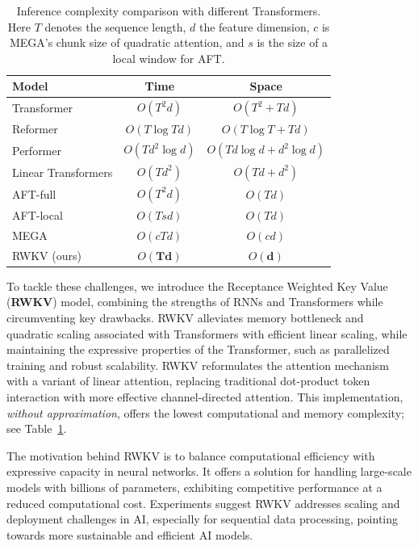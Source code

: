 \documentclass[11pt]{article}
\begin{document}
\begin{table}
\centering
\setlength{\tabcolsep}{2pt}
\small
\begin{tabular}{lcc}
\toprule
\textbf{Model} & \textbf{Time} & \textbf{Space}\\
\midrule
Transformer & $O(T^2d)$ & $O(T^2 + Td)$ \\
Reformer & $O(T\log{T}  d)$ & $O(T\log{T} + Td)$ \\
Performer & $O(T d^2\log{d})$ & $O(Td\log{d} + d^2\log{d})$ \\
Linear Transformers & $O(T d^2)$ & $O(Td + d^2)$ \\
AFT-full & $O(T^2d)$ & $O(Td)$ \\
AFT-local & $O(T sd)$ & $O(Td)$ \\
MEGA & $O(cTd)$ & $O(cd)$\\\midrule
RWKV (ours) & $O(\mathbf{Td})$ & $O(\mathbf{d})$ \\
\bottomrule
\end{tabular}
\caption{Inference complexity comparison with different Transformers. Here $T$ denotes the sequence length, $d$ the feature dimension, $c$ is MEGA's chunk size of quadratic attention, and $s$ is the size of a local window for AFT.}
\label{tab:comparison}
\end{table}

To tackle these challenges, we introduce the Receptance Weighted Key Value (\textbf{RWKV}) model, combining the strengths of RNNs and Transformers while circumventing key drawbacks. RWKV alleviates  memory bottleneck and quadratic scaling associated with Transformers  \cite{katharopoulos2020transformers} with efficient linear scaling, while maintaining the expressive properties of the Transformer, such as  parallelized training and robust scalability. RWKV reformulates the attention mechanism with a variant of linear attention, replacing traditional dot-product token interaction with more effective channel-directed attention. This implementation, \emph{without approximation}, offers the lowest computational and memory complexity; see Table~\ref{tab:comparison}.

The motivation behind RWKV is to balance computational efficiency with expressive capacity in neural networks. It offers a solution for handling large-scale models with billions of parameters, exhibiting competitive performance at a reduced computational cost. Experiments suggest RWKV addresses  scaling and deployment challenges in AI, especially for sequential data processing, pointing towards more sustainable and efficient AI models.
\end{document}

